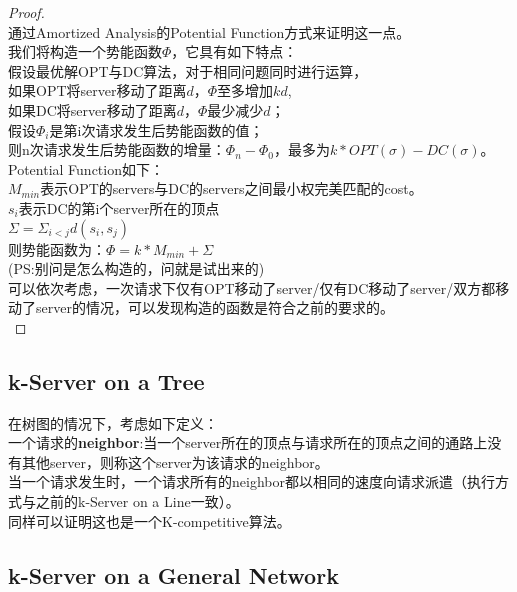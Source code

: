 \documentclass[11pt]{ctexart}
\newtheorem{proof}{Proof}[section]
\begin{document}
\begin{proof}\\
通过Amortized Analysis的Potential Function方式来证明这一点。\\
我们将构造一个势能函数$\Phi$，它具有如下特点：\\

假设最优解OPT与DC算法，对于相同问题同时进行运算，\\
如果OPT将server移动了距离$d$，$\Phi$至多增加$kd$,\\
如果DC将server移动了距离$d$，$\Phi$最少减少$d$；\\
假设$\Phi_i$是第i次请求发生后势能函数的值；\\
则n次请求发生后势能函数的增量：$\Phi_n-\Phi_0$，最多为$k*OPT(\sigma)-DC(\sigma)$。\\

Potential Function如下：\\
$M_{min}$表示OPT的servers与DC的servers之间最小权完美匹配的cost。\\
$s_i$表示DC的第i个server所在的顶点\\
$\Sigma=\Sigma_{i<j}d(s_i,s_j)$\\
则势能函数为：$\Phi=k*M_{min}+\Sigma$\\

(PS:别问是怎么构造的，问就是试出来的)\\

可以依次考虑，一次请求下仅有OPT移动了server/仅有DC移动了server/双方都移动了server的情况，可以发现构造的函数是符合之前的要求的。\\
\end{proof}

\subsection{k-Server on a Tree}
在树图的情况下，考虑如下定义：\\

一个请求的\textbf{neighbor}:当一个server所在的顶点与请求所在的顶点之间的通路上没有其他server，则称这个server为该请求的neighbor。\\

当一个请求发生时，一个请求所有的neighbor都以相同的速度向请求派遣（执行方式与之前的k-Server on a Line一致）。\\

同样可以证明这也是一个K-competitive算法。

\subsection{k-Server on a General Network}
\end{document}
